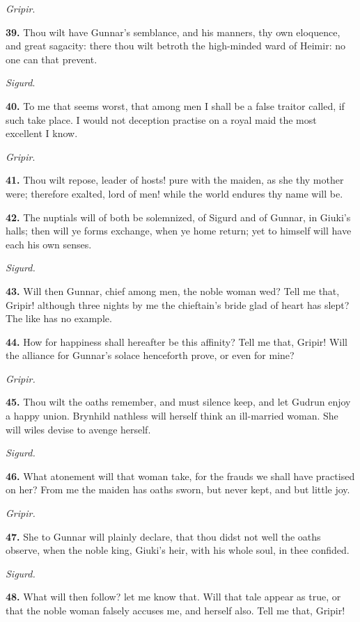 \emph{Gripir}.

\textbf{39.} Thou wilt have Gunnar's semblance, and his manners, thy own
eloquence, and great sagacity: there thou wilt betroth the high-minded
ward of Heimir: no one can that prevent.

\emph{Sigurd}.

\textbf{40.} To me that seems worst, that among men I shall be a false
traitor called, if such take place. I would not deception practise on
a royal maid the most excellent I know.

\emph{Gripir}.

\textbf{41.} Thou wilt repose, leader of hosts! pure with the maiden, as she
thy mother were; therefore exalted, lord of men! while the world
endures thy name will be.

\textbf{42.} The nuptials will of both be solemnized, of Sigurd and of
Gunnar, in Giuki's halls; then will ye forms exchange, when ye home
return; yet to himself will have each his own senses.

\emph{Sigurd.}

\textbf{43.} Will then Gunnar, chief among men, the noble woman wed? Tell me
that, Gripir! although three nights by me the chieftain's bride glad
of heart has slept? The like has no example.

\textbf{44.} How for happiness shall hereafter be this affinity? Tell me
that, Gripir! Will the alliance for Gunnar's solace henceforth prove,
or even for mine?

\emph{Gripir.}

\textbf{45.} Thou wilt the oaths remember, and must silence keep, and let
Gudrun enjoy a happy union. Brynhild nathless will herself think an
ill-married woman. She will wiles devise to avenge herself.

\emph{Sigurd.}

\textbf{46.} What atonement will that woman take, for the frauds we shall
have practised on her? From me the maiden has oaths sworn, but never
kept, and but little joy.

\emph{Gripir.}

\textbf{47.} She to Gunnar will plainly declare, that thou didst not well the
oaths observe, when the noble king, Giuki's heir, with his whole soul,
in thee confided.

\emph{Sigurd.}

\textbf{48.} What will then follow? let me know that. Will that tale appear
as true, or that the noble woman falsely accuses me, and herself also.
Tell me that, Gripir!


